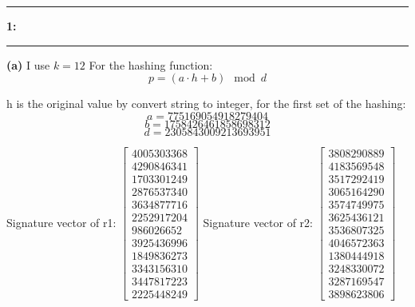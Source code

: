 \documentclass[11pt]{article}
\newcommand\question[2]{\vspace{.25in}\hrule\textbf{#1: #2}\vspace{.5em}\hrule\vspace{.10in}}
\renewcommand\part[1]{\vspace{.10in}\textbf{(#1)}}
\begin{document}
\raggedright
\newcommand\NAME{Nan Du}  %
\newcommand\ANDREWID{dunan}     %
\newcommand\HWNUM{2}              %


\question{1}{} 

\part{a} 
I use $ k = 12 $
For the hashing function:
\[ p = (a \cdot h + b)\mod d \]

h is the original value by convert string to integer, for the first set of the hashing:
\[ a = 775169054918279404 \]
\[ b = 1758426461858698312 \]
\[ d = 2305843009213693951 \]


Signature vector of r1:
$ \begin{bmatrix}
4005303368\\ 4290846341\\ 1703301249\\ 2876537340\\ 3634877716\\ 2252917204\\986026652\\ 3925436996\\ 1849836273\\ 3343156310\\ 3447817223\\ 2225448249
\end{bmatrix} $
Signature vector of r2:
$ \begin{bmatrix}
3808290889\\ 4183569548\\ 3517292419\\ 3065164290\\ 3574749975\\ 3625436121\\
3536807325\\ 4046572363\\ 1380444918\\ 3248330072\\ 3287169547\\ 3898623806
\end{bmatrix} $
\end{document}
